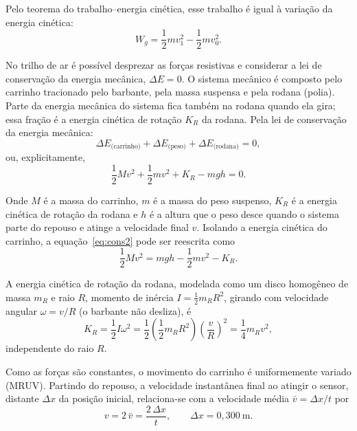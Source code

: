 \documentclass[12pt,a4paper]{article}
\begin{document}
Pelo teorema do trabalho--energia cinética, esse trabalho é igual à variação da energia cinética:
\begin{equation}
\label{eq:Wg2}
W_g = \frac{1}{2}mv_1^2 - \frac{1}{2}mv_0^2.
\end{equation}

No trilho de ar é possível desprezar as forças resistivas e considerar a lei de conservação da
energia mecânica, $\Delta E = 0$. O sistema mecânico é composto pelo carrinho tracionado pelo
barbante, pela massa suspensa e pela rodana (polia). Parte da energia mecânica do sistema fica
também na rodana quando ela gira; essa fração é a energia cinética de rotação $K_R$ da rodana.
Pela lei de conservação da energia mecânica:
\begin{equation}
\label{eq:cons}
\Delta E_{\text{(carrinho)}} + \Delta E_{\text{(peso)}} + \Delta E_{\text{(rodana)}} = 0,
\end{equation}
ou, explicitamente,
\begin{equation}
\label{eq:cons2}
\frac{1}{2}Mv^2 + \frac{1}{2}mv^2 + K_R - mgh = 0.
\end{equation}

Onde $M$ é a massa do carrinho, $m$ é a massa do peso suspenso, $K_R$ é a energia cinética de
rotação da rodana e $h$ é a altura que o peso desce quando o sistema parte do repouso e atinge a
velocidade final $v$. Isolando a energia cinética do carrinho, a equação~\eqref{eq:cons2} pode
ser reescrita como
\begin{equation}
\label{eq:KM}
\frac{1}{2}Mv^2 = mgh - \frac{1}{2}mv^2 - K_R.
\end{equation}

A energia cinética de rotação da rodana, modelada como um disco homogêneo de massa $m_R$ e raio
$R$, momento de inércia $I = \tfrac{1}{2}m_R R^2$, girando com velocidade angular $\omega = v/R$
(o barbante não desliza), é
\begin{equation}
\label{eq:KR}
K_R = \frac{1}{2}I\omega^2 = \frac{1}{2}\left(\frac{1}{2}m_R R^2\right)\left(\frac{v}{R}\right)^2
= \frac{1}{4}m_R v^2,
\end{equation}
independente do raio $R$.

Como as forças são constantes, o movimento do carrinho é uniformemente variado (MRUV). Partindo
do repouso, a velocidade instantânea final ao atingir o sensor, distante $\Delta x$ da posição
inicial, relaciona-se com a velocidade média $\bar{v} = \Delta x / t$ por
\begin{equation}
\label{eq:vinst}
v = 2\,\bar{v} = \frac{2\,\Delta x}{t}, \qquad \Delta x = 0{,}300~\mathrm{m}.
\end{equation}
\end{document}
